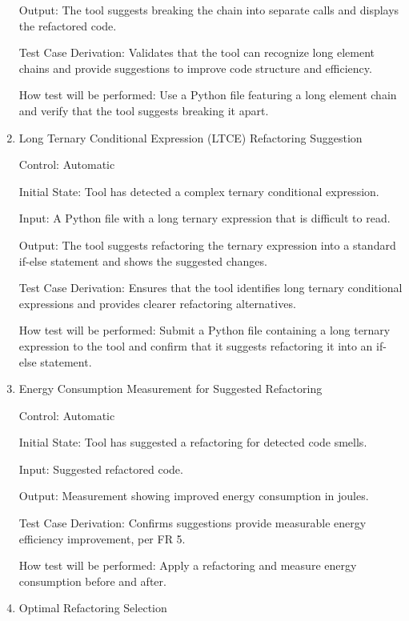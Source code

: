 \documentclass[12pt, titlepage]{article}
\begin{document}
\begin{enumerate}
  Output: The tool suggests breaking the chain into separate calls and displays the refactored code.
  
  Test Case Derivation: Validates that the tool can recognize long element chains and provide suggestions to improve code structure and efficiency.
            
  How test will be performed: Use a Python file featuring a long element chain and verify that the tool suggests breaking it apart.
  
  \item{Long Ternary Conditional Expression (LTCE) Refactoring Suggestion\\}
  
  Control: Automatic
            
  Initial State: Tool has detected a complex ternary conditional expression.
            
  Input: A Python file with a long ternary expression that is difficult to read.
            
  Output: The tool suggests refactoring the ternary expression into a standard if-else statement and shows the suggested changes.
  
  Test Case Derivation: Ensures that the tool identifies long ternary conditional expressions and provides clearer refactoring alternatives.
            
  How test will be performed: Submit a Python file containing a long ternary expression to the tool and confirm that it suggests refactoring it into an if-else statement.
  
  \item{Energy Consumption Measurement for Suggested Refactoring\\}
  
  Control: Automatic
            
  Initial State: Tool has suggested a refactoring for detected code smells.
            
  Input: Suggested refactored code.
            
  Output: Measurement showing improved energy consumption in joules.
  
  Test Case Derivation: Confirms suggestions provide measurable energy efficiency improvement, per FR 5.
            
  How test will be performed: Apply a refactoring and measure energy consumption before and after.
  
  \item{Optimal Refactoring Selection\\}
  

\end{enumerate}
\end{document}
